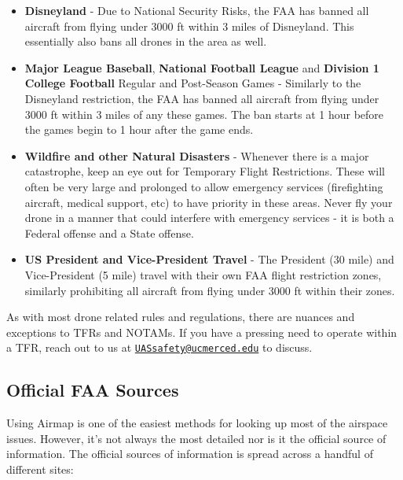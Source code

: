 \documentclass[
  12pt,
]{book}
\providecommand{\tightlist}{%
  \setlength{\itemsep}{0pt}\setlength{\parskip}{0pt}}
\newenvironment{notebox}{
  \definecolor{shadecolor}{gray}{.8}  %
  \color{black}
  \begin{shaded}}
 {\end{shaded}}
\begin{document}
\begin{itemize}
\tightlist
\item
  \textbf{Disneyland} - Due to National Security Risks, the FAA has banned all aircraft from flying under 3000 ft within 3 miles of Disneyland. This essentially also bans all drones in the area as well.\\
\item
  \textbf{Major League Baseball}, \textbf{National Football League} and \textbf{Division 1 College Football} Regular and Post-Season Games - Similarly to the Disneyland restriction, the FAA has banned all aircraft from flying under 3000 ft within 3 miles of any these games. The ban starts at 1 hour before the games begin to 1 hour after the game ends.\\
\item
  \textbf{Wildfire and other Natural Disasters} - Whenever there is a major catastrophe, keep an eye out for Temporary Flight Restrictions. These will often be very large and prolonged to allow emergency services (firefighting aircraft, medical support, etc) to have priority in these areas. Never fly your drone in a manner that could interfere with emergency services - it is both a Federal offense and a State offense.\\
\item
  \textbf{US President and Vice-President Travel} - The President (30 mile) and Vice-President (5 mile) travel with their own FAA flight restriction zones, similarly prohibiting all aircraft from flying under 3000 ft within their zones.
\end{itemize}

\begin{notebox}
As with most drone related rules and regulations, there are nuances and exceptions to TFRs and NOTAMs. If you have a pressing need to operate within a TFR, reach out to us at \href{mailto:UASsafety@ucmerced.edu}{\nolinkurl{UASsafety@ucmerced.edu}} to discuss.

\end{notebox}

\hypertarget{official-faa-sources}{%
\subsection{Official FAA Sources}\label{official-faa-sources}}

Using Airmap is one of the easiest methods for looking up most of the airspace issues. However, it's not always the most detailed nor is it the official source of information. The official sources of information is spread across a handful of different sites:
\end{document}
